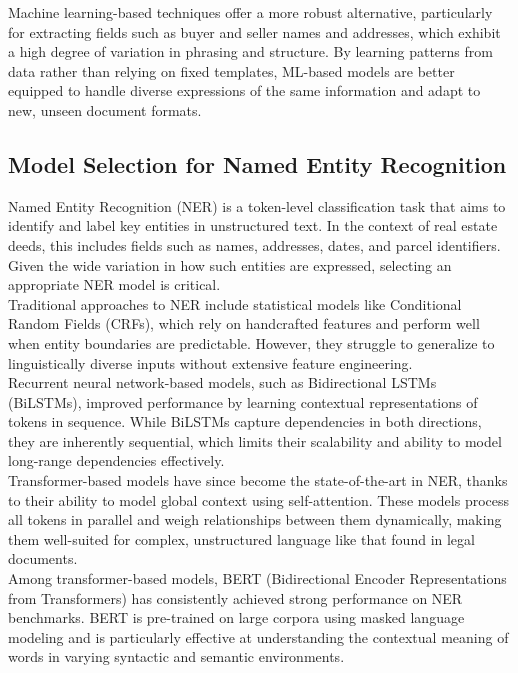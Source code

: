 \documentclass{article}
\begin{document}
Machine learning-based techniques offer a more robust alternative, particularly for extracting fields such as buyer and seller names and addresses, which exhibit a high degree of variation in phrasing and structure. By learning patterns from data rather than relying on fixed templates, ML-based models are better equipped to handle diverse expressions of the same information and adapt to new, unseen document formats.


\subsection{Model Selection for Named Entity Recognition}

Named Entity Recognition (NER) is a token-level classification task that aims to identify and label key entities in unstructured text. In the context of real estate deeds, this includes fields such as names, addresses, dates, and parcel identifiers. Given the wide variation in how such entities are expressed, selecting an appropriate NER model is critical. \\

Traditional approaches to NER include statistical models like Conditional Random Fields (CRFs), which rely on handcrafted features and perform well when entity boundaries are predictable. However, they struggle to generalize to linguistically diverse inputs without extensive feature engineering. \\

Recurrent neural network-based models, such as Bidirectional LSTMs (BiLSTMs), improved performance by learning contextual representations of tokens in sequence. While BiLSTMs capture dependencies in both directions, they are inherently sequential, which limits their scalability and ability to model long-range dependencies effectively. \\

Transformer-based models have since become the state-of-the-art in NER, thanks to their ability to model global context using self-attention. These models process all tokens in parallel and weigh relationships between them dynamically, making them well-suited for complex, unstructured language like that found in legal documents. \\

Among transformer-based models, BERT (Bidirectional Encoder Representations from Transformers) has consistently achieved strong performance on NER benchmarks. BERT is pre-trained on large corpora using masked language modeling and is particularly effective at understanding the contextual meaning of words in varying syntactic and semantic environments. \\
\end{document}
